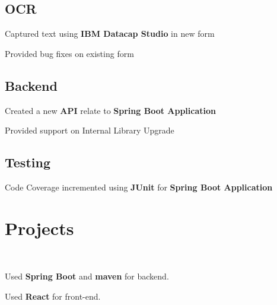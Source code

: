 \documentclass[]{deedy-resume-openfont}
\begin{document}
\begin{minipage}[t]{0.66\textwidth}
\subsection{OCR}
\sectionsep
\begin{tightemize}
\item Captured text using \textbf{IBM Datacap Studio} in new form
\item Provided bug fixes on existing form 
\end{tightemize}
\sectionsep

\subsection{Backend}
\sectionsep
\begin{tightemize}
\item Created a new \textbf{API} relate to \textbf{Spring Boot Application}
\item Provided support on Internal Library Upgrade 
\end{tightemize}
\sectionsep

\subsection{Testing}
\sectionsep
\begin{tightemize}
\item Code Coverage incremented using \textbf{JUnit} for \textbf{Spring Boot Application}
\end{tightemize}
\sectionsep




\section{Projects}

\\
\sectionsep
\begin{tightemize}
\item Used \textbf{Spring Boot} and \textbf{maven} for backend.
\item Used \textbf{React} for front-end. 
\end{tightemize}
\sectionsep










\end{minipage}
\end{document}
